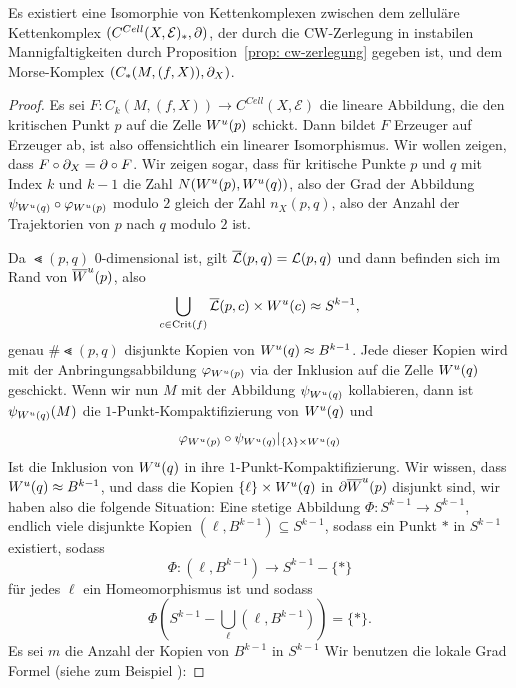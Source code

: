 \begin{theorem}
    \label{satz: morse-homologie ist zellulaere homologie}
    Es existiert eine Isomorphie von Kettenkomplexen zwischen dem zelluläre Kettenkomplex 
    $(C^{Cell}(X, \mathcal{E})_{\ast}, { \partial })$, der durch die CW-Zerlegung in instabilen 
    Mannigfaltigkeiten durch 
    Proposition~\ref{prop: cw-zerlegung} gegeben ist, und dem Morse-Komplex 
    $(C_{\ast}(M, (f, X)), { \partial }_X)$.
\end{theorem}

\begin{proof}
    Es sei $F \colon C_k (M, (f, X)) \to C^{Cell}(X, \mathcal{E})$ die lineare Abbildung, 
    die den kritischen Punkt $p$
    auf die Zelle ${ W^u } (p)$ schickt. Dann bildet $F$ Erzeuger auf Erzeuger ab, ist also 
    offensichtlich ein linearer Isomorphismus. Wir wollen zeigen, dass 
    $F \circ { \partial }_X = { \partial } \circ F$. Wir zeigen sogar, dass für kritische Punkte $p$ und $q$ mit 
    Index $k$ und $k - 1$ die Zahl $N ({ W^u } (p), { W^u } (q))$, also der Grad der Abbildung 
    $\psi_{{ W^u } (q)} \circ \varphi_{{ W^u } (p)}$ modulo $2$ gleich der Zahl $n_X(p, q)$, also 
    der Anzahl der Trajektorien von $p$ nach $q$ modulo $2$ ist. 

    Da $\Lt (p, q)$ $0$-dimensional ist, gilt ${\overline{\mathcal{L}} } (p, q) = { \mathcal{L} } (p, q)$ und dann befinden sich im 
    Rand von ${ \overline{W}^u } (p)$, also 
    \[ \bigcup_{c \in { \operatorname{Crit} } (f)} {\overline{\mathcal{L}} } (p, c) \times { W^u } (c) \approx S^{k - 1} , \] 
    genau $\# \Lt (p, q)$ disjunkte Kopien von ${ W^u } (q) \approx B^{k - 1}$. Jede dieser Kopien 
    wird mit der Anbringungsabbildung $\varphi_{{ W^u } (p)}$ via der Inklusion auf die Zelle ${ W^u } (q)$
    geschickt. Wenn wir nun $M$ mit der Abbildung $\psi_{{ W^u } (q)}$ kollabieren, dann ist 
    $\psi_{{ W^u } (q)} (M)$ die $1$-Punkt-Kompaktifizierung von ${ W^u } (q)$ und 
    \[ \varphi_{{ W^u } (p)} \circ \psi_{{ W^u } (q)} |_{ \{ \lambda \} \times { W^u } (q) } \]
    Ist die Inklusion von ${ W^u } (q)$ in ihre $1$-Punkt-Kompaktifizierung. Wir wissen, dass 
    ${ W^u } (q) \approx B^{k - 1}$, und dass die Kopien $\{ \ell \} \times { W^u } (q)$ in 
    ${ \partial } { \overline{W}^u } (p)$ disjunkt sind, wir haben also die folgende Situation:
    Eine stetige Abbildung $\Phi \colon S^{k - 1} \to S^{k - 1}$, endlich viele disjunkte Kopien 
    $(\ell, B^{k - 1}) \subseteq S^{k - 1}$, sodass ein Punkt $\ast$ in $S^{k - 1}$ existiert, sodass
    \[ \Phi \colon (\ell, B^{k - 1}) \to S^{k - 1} - \{ \ast \} \]
    für jedes $\ell$ ein Homeomorphismus ist und sodass
    \[ \Phi \left( S^{k - 1} - \bigcup_{\ell} \left( \ell, B^{k - 1} \right) \right) = \{ \ast \} . \]
    Es sei $m$ die Anzahl der Kopien von $B^{k - 1}$ in $S^{k - 1}$
    Wir benutzen die lokale Grad Formel (siehe zum Beispiel \cite{hatcher}): 
    

\end{proof}
